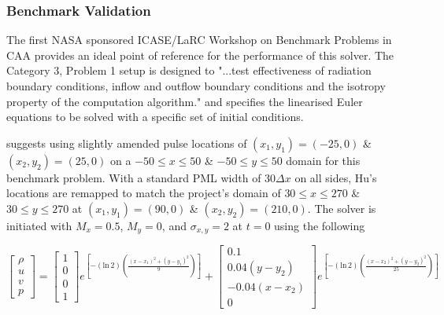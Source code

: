 \subsubsection{Benchmark Validation}

The first NASA sponsored ICASE/LaRC Workshop on Benchmark Problems in CAA \cite{hardin1995caaworkshop} provides an ideal point of reference for the performance of this solver. The Category 3, Problem 1 setup is designed to "...test effectiveness of radiation boundary conditions, inflow and outflow boundary conditions and the isotropy property of the computation algorithm." and specifies the linearised Euler equations to be solved with a specific set of initial conditions.

\textcite{hu1996onabsorbingbc} suggests using slightly amended pulse locations of $\left(x_1,y_1\right)=(-25,0)$ \& $\left(x_2,y_2\right)=(25,0)$ on a $-50 \leq x \leq 50$ \& $-50 \leq y \leq 50$ domain for this benchmark problem. With a standard PML width of $30\Delta x$ on all sides, Hu's locations are remapped to match the project's domain of $30 \leq x \leq 270$ \& $30 \leq y \leq 270$ at $\left(x_1,y_1\right)=(90,0)$ \& $\left(x_2,y_2\right)=(210,0)$. The solver is initiated with $M_x=0.5$, $M_y=0$, and $\sigma_{x,y}=2$ at $t=0$ using the following



\begin{equation} \label{eq:BenchmarkEqs}
    \begin{bmatrix}
    \rho \\
    u \\
    v \\
    p
    \end{bmatrix}
    = 
    \begin{bmatrix}
    1 \\
    0 \\
    0 \\
    1
    \end{bmatrix}
    e^{\left[ - \left( \mathrm{ln} \, 2 \right) \left( \frac{\left(x-x_1 \right)^2 + \left(y-y_1 \right)^2}{9} \right) \right]}
    + 
    \begin{bmatrix}
    0.1 \\
    0.04\left(y-y_2\right) \\
    -0.04\left(x-x_2\right) \\
    0
    \end{bmatrix}
    e^{\left[ - \left( \mathrm{ln} \, 2 \right) \left( \frac{ \left(x-x_2 \right)^2 + \left(y-y_2 \right)^2}{25} \right) \right]}
\end{equation}

